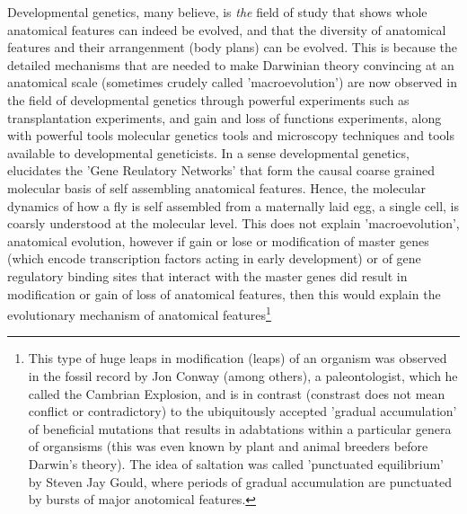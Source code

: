 Developmental genetics, many believe, is \textit{the} field of study that shows whole anatomical features can indeed be evolved, and that the diversity of anatomical features and their arrangenment (body plans) can be evolved.  This is because the detailed mechanisms that are needed to make Darwinian theory convincing at an anatomical scale (sometimes crudely called 'macroevolution') are now observed in the field of developmental genetics through powerful experiments such as transplantation experiments, and gain and loss of functions experiments, along with powerful tools molecular genetics tools and microscopy techniques and tools available to developmental geneticists.  In a sense developmental genetics, elucidates the 'Gene Reulatory Networks' that form the causal coarse grained molecular basis of self assembling anatomical features.  Hence, the molecular dynamics of how a fly is self assembled from a maternally laid egg, a single cell, is coarsly understood at the molecular level.  This does not explain 'macroevolution', anatomical evolution, however if gain or lose or modification of master genes (which encode transcription factors acting in early development) or of gene regulatory binding sites that interact with the master genes did result in modification or gain of loss of anatomical features, then this would explain the evolutionary mechanism of anatomical features\footnote{This type of huge leaps in modification (leaps) of an organism was observed in the fossil record by Jon Conway (among others), a paleontologist, which he called the Cambrian Explosion, and is in contrast (constrast does not mean conflict or contradictory) to the ubiquitously accepted 'gradual accumulation' of beneficial mutations that results in adabtations within a particular genera of organsisms (this was even known by plant and animal breeders before Darwin's theory).  The idea of saltation was called 'punctuated equilibrium' by Steven Jay Gould, where periods of gradual accumulation are punctuated by bursts of major anotomical features.}  

